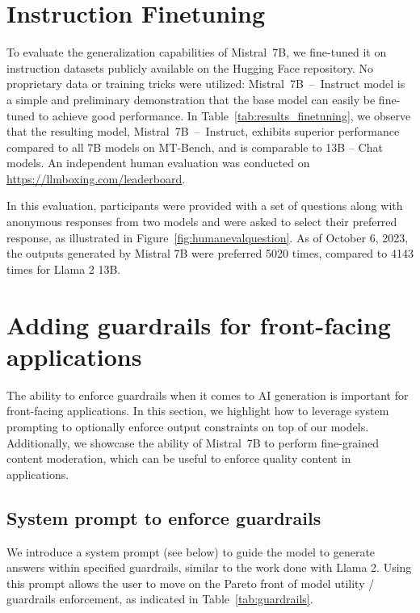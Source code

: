 \documentclass{article}
\def\llama{Llama\xspace}
\def\mistral{Mistral~7B\xspace}
\def\mistralchat{Mistral~7B~--~Instruct\xspace}
\begin{document}
\section{Instruction Finetuning}

 To evaluate the generalization capabilities of \mistral, we fine-tuned it on instruction datasets publicly available on the Hugging Face repository.
No proprietary data or training tricks were utilized: \mistralchat model is a simple and preliminary demonstration that the base model can easily be fine-tuned to achieve good performance.
In Table~\ref{tab:results_finetuning}, we observe that the resulting model, \mistralchat, exhibits superior performance compared to all 7B models on MT-Bench, and is comparable to 13B -- Chat models.
An independent human evaluation was conducted on \url{https://llmboxing.com/leaderboard}.

In this evaluation, participants were provided with a set of questions along with anonymous responses from two models and were asked to select their preferred response, as illustrated in Figure~\ref{fig:humanevalquestion}.
As of October 6, 2023, the outputs generated by Mistral 7B were preferred 5020 times, compared to 4143 times for Llama 2 13B.

\section{Adding guardrails for front-facing applications}

 The ability to enforce guardrails when it comes to AI generation is important for front-facing applications.
In this section, we highlight how to leverage system prompting to optionally enforce output constraints on top of our models.
Additionally, we showcase the ability of \mistral to perform fine-grained content moderation, which can be useful to enforce quality content in applications.

\subsection{System prompt to enforce guardrails}

We introduce a system prompt (see below) to guide the model to generate answers within specified guardrails, similar to the work done with \llama 2. Using this prompt allows the user to move on the Pareto front of model utility / guardrails enforcement, as indicated in Table~\ref{tab:guardrails}.
\end{document}
